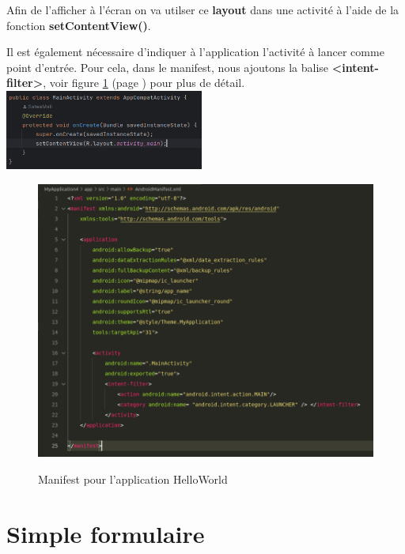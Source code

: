 \documentclass[a4paper]{article}
\begin{document}
\begin{multicols}{2}
  Afin de l'afficher à l'écran on va utilser ce \textbf{layout} dans une activité à l'aide de la fonction \textbf{setContentView()}.
  \newline

  Il est également nécessaire d'indiquer à l'application l'activité à lancer comme point d'entrée. Pour cela, dans le manifest, nous ajoutons la balise \textbf{<intent-filter>}, voir figure \ref{fig:manifestHelloWorld} (page \pageref{fig:manifestHelloWorld}) pour plus de détail.
  \newline
  \newline
  \includegraphics[width=0.49\textwidth]{screenshotCodeHelloWorld.png}
\begin{figure}
  \centering
  \caption{Manifest pour l'application HelloWorld}
  \includegraphics[width=.7\textwidth]{screenshotHelloWorldManifest.png}
  \label{fig:manifestHelloWorld}
\end{figure}
\section{Simple formulaire}  

\end{multicols}
\end{document}
